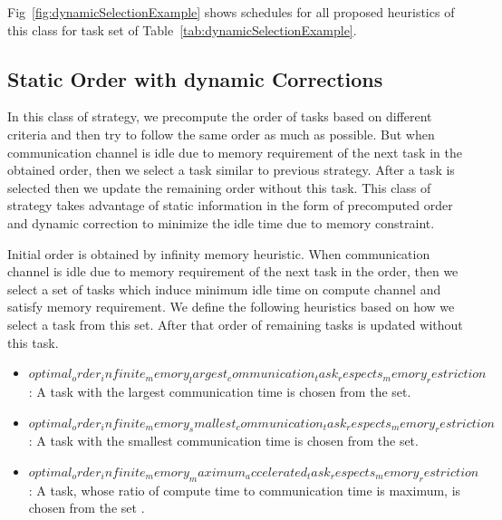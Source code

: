 \documentclass[runningheads]{llncs} %
\begin{document}
Fig~\ref{fig:dynamicSelectionExample} shows schedules for all proposed heuristics of this class for task set of Table~\ref{tab:dynamicSelectionExample}.

\subsection{Static Order with dynamic Corrections}

In this class of strategy, we precompute the order of tasks based on different criteria and then try to follow the same order as much as possible. But when communication channel is idle due to memory requirement of the next task in the obtained order, then we select a task similar to previous strategy. After a task is selected then we update the remaining order without this task. This class of strategy takes advantage of  static information in the form of precomputed order and dynamic correction to minimize the idle time due to memory constraint.

Initial order is obtained by infinity memory heuristic. When communication channel is idle due to memory requirement of the next task in the order, then we select a set of tasks which induce minimum idle time on compute channel and satisfy memory requirement. We define the following heuristics based on how we select a task from this set. After that order of remaining  tasks is updated without this task.

\begin{itemize}[a)]
	\item $optimal_order_infinite_memory_largest_communication_task_respects_memory_restriction$: A task with the largest communication time is chosen from the set.
	\item $optimal_order_infinite_memory_smallest_communication_task_respects_memory_restriction$:  A task with the smallest communication time is chosen from the set.
	\item $optimal_order_infinite_memory_maximum_accelerated_task_respects_memory_restriction$: A task,  whose ratio of compute time to communication time is maximum, is chosen from the set .
\end{itemize}
\end{document}
